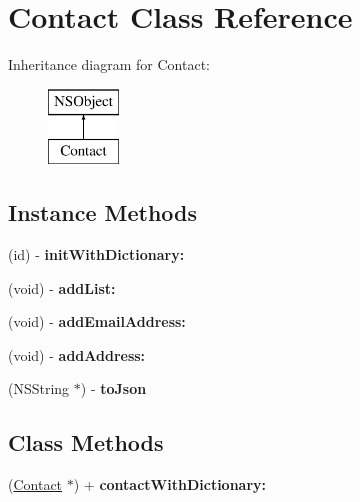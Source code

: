 \hypertarget{interface_contact}{\section{Contact Class Reference}
\label{interface_contact}
}
Inheritance diagram for Contact\-:\begin{figure}[H]
\begin{center}
\leavevmode
\includegraphics[height=2.000000cm]{interface_contact}
\end{center}
\end{figure}
\subsection*{Instance Methods}
\begin{DoxyCompactItemize}
\item 
\hypertarget{interface_contact_a899404ecb81550be559c297f3c8302eb}{(id) -\/ {\bfseries init\-With\-Dictionary\-:}}\label{interface_contact_a899404ecb81550be559c297f3c8302eb}

\item 
\hypertarget{interface_contact_a57dd8a4ba092145487a90ddc52ee57bf}{(void) -\/ {\bfseries add\-List\-:}}\label{interface_contact_a57dd8a4ba092145487a90ddc52ee57bf}

\item 
\hypertarget{interface_contact_a1eac37e0e1065a838a21d5153837d7d6}{(void) -\/ {\bfseries add\-Email\-Address\-:}}\label{interface_contact_a1eac37e0e1065a838a21d5153837d7d6}

\item 
\hypertarget{interface_contact_a990cab58fd441204d41595534d92d838}{(void) -\/ {\bfseries add\-Address\-:}}\label{interface_contact_a990cab58fd441204d41595534d92d838}

\item 
\hypertarget{interface_contact_a57f764a589a1c7099e0b4ed76138fe98}{(N\-S\-String $\ast$) -\/ {\bfseries to\-Json}}\label{interface_contact_a57f764a589a1c7099e0b4ed76138fe98}

\end{DoxyCompactItemize}
\subsection*{Class Methods}
\begin{DoxyCompactItemize}
\item 
\hypertarget{interface_contact_aa05ff62d981764acd92474352457e248}{(\hyperlink{interface_contact}{Contact} $\ast$) + {\bfseries contact\-With\-Dictionary\-:}}\label{interface_contact_aa05ff62d981764acd92474352457e248}

\end{DoxyCompactItemize}
